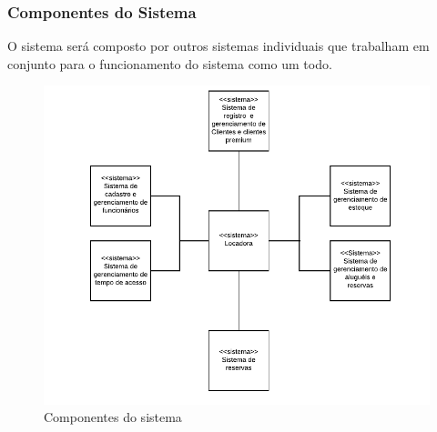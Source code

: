 \documentclass{article}
\begin{document}
        \subsubsection{Componentes do Sistema}
         O sistema será composto por outros sistemas individuais que trabalham em conjunto para o funcionamento do sistema como um todo.
        \begin{figure}[H]
            \label{fig: Diagrama de contexto} 
            \centering
            \includegraphics[width=1.0\textwidth]{pictures/contexto.PNG} 
            \caption {Componentes do sistema} 
        \end{figure}
\end{document}
